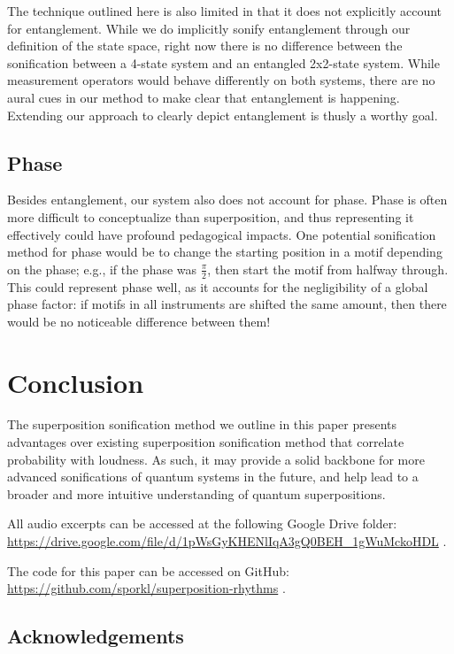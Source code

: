 \documentclass[10pt,twocolumn]{article}
\begin{document}
The technique outlined here is also limited in that it does not explicitly account for entanglement. While we do implicitly sonify entanglement through our definition of the state space, right now there is no difference between the sonification between a 4-state system and an entangled 2x2-state system. While measurement operators would behave differently on both systems, there are no aural cues in our method to make clear that entanglement is happening. Extending our approach to clearly depict entanglement is thusly a worthy goal.

\subsection{Phase}

Besides entanglement, our system also does not account for phase. Phase is often more difficult to conceptualize than superposition, and thus representing it effectively could have profound pedagogical impacts. One potential sonification method for phase would be to change the starting position in a motif depending on the phase; e.g., if the phase was $\frac{\pi}{2}$, then start the motif from halfway through. This could represent phase well, as it accounts for the negligibility of a global phase factor: if motifs in all instruments are shifted the same amount, then there would be no noticeable difference between them!

\section{Conclusion}

The superposition sonification method we outline in this paper presents advantages over existing superposition sonification method that correlate probability with loudness. As such, it may provide a solid backbone for more advanced sonifications of quantum systems in the future, and help lead to a broader and more intuitive understanding of quantum superpositions.

All audio excerpts can be accessed at the following Google Drive folder: \url{https://drive.google.com/file/d/1pWsGyKHENlIqA3gQ0BEH_1gWuMckoHDL} .

The code for this paper can be accessed on GitHub: \url{https://github.com/sporkl/superposition-rhythms} .

\subsection{Acknowledgements}
\end{document}
